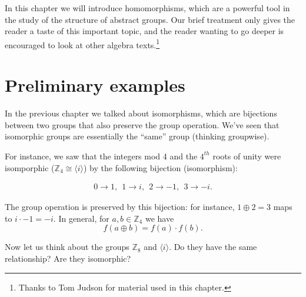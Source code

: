 



In this chapter we will introduce homomorphisms, which are a powerful tool in the study of the structure of abstract groups. Our brief treatment only gives the reader a taste of this important topic, and the reader wanting to go deeper is encouraged to look at other algebra texts.\footnote{Thanks to Tom Judson for material used in this chapter.}
 
\section{Preliminary examples}\label{homomorph_defn_ex}

  
In the previous chapter we talked about isomorphisms, which are bijections between two groups that also preserve
the group operation. We've seen that isomorphic groups are essentially the ``same'' group (thinking groupwise). 

For instance, we saw that the integers mod 4 and the $4^{th}$ roots of unity were isomporphic (${\mathbb Z_4} \cong \langle i \rangle$)  by the following bijection (isomorphism):

\begin{align*}
    0 \rightarrow 1 ,~~     1 \rightarrow i,~~    2 \rightarrow -1,~~   3 \rightarrow -i.
\end{align*}

The group operation is preserved by this bijection:  for instance, $1  \oplus 2=3$ maps to 
$i \cdot -1 = -i$.
In general, for $a,b \in {\mathbb Z_4}$ we have
$$f(a \oplus b) = f(a) \cdot f(b).$$

 Now let us think about the groups \emph{ ${\mathbb Z_8}$} and $\langle i \rangle$.  Do they have the same relationship?  Are they isomorphic? 

